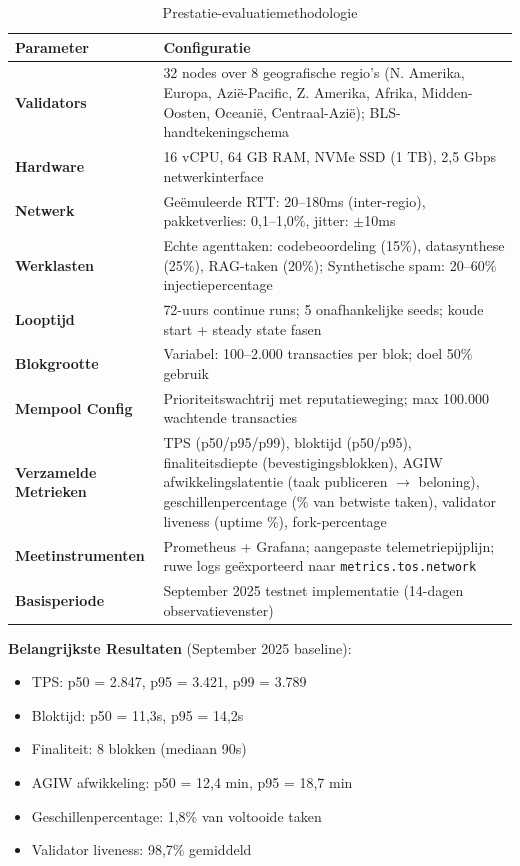 \documentclass[11pt]{article}
\begin{document}
\begin{table}[H]
\centering
\caption{Prestatie-evaluatiemethodologie}
\label{tab:evaluation-methodology}
\begin{tabular}{@{}p{}p{}@{}}
\toprule
\textbf{Parameter} & \textbf{Configuratie} \\ \midrule
\textbf{Validators} & 32 nodes over 8 geografische regio's (N. Amerika, Europa, Azië-Pacific, Z. Amerika, Afrika, Midden-Oosten, Oceanië, Centraal-Azië); BLS-handtekeningschema \\
\textbf{Hardware} & 16 vCPU, 64 GB RAM, NVMe SSD (1 TB), 2,5 Gbps netwerkinterface \\
\textbf{Netwerk} & Geëmuleerde RTT: 20--180ms (inter-regio), pakketverlies: 0,1--1,0\%, jitter: $\pm$10ms \\
\textbf{Werklasten} & Echte agenttaken: codebeoordeling (15\%), datasynthese (25\%), RAG-taken (20\%); Synthetische spam: 20--60\% injectiepercentage \\
\textbf{Looptijd} & 72-uurs continue runs; 5 onafhankelijke seeds; koude start + steady state fasen \\
\textbf{Blokgrootte} & Variabel: 100--2.000 transacties per blok; doel 50\% gebruik \\
\textbf{Mempool Config} & Prioriteitswachtrij met reputatieweging; max 100.000 wachtende transacties \\
\textbf{Verzamelde Metrieken} & TPS (p50/p95/p99), bloktijd (p50/p95), finaliteitsdiepte (bevestigingsblokken), AGIW afwikkelingslatentie (taak publiceren $\rightarrow$ beloning), geschillenpercentage (\% van betwiste taken), validator liveness (uptime \%), fork-percentage \\
\textbf{Meetinstrumenten} & Prometheus + Grafana; aangepaste telemetriepijplijn; ruwe logs geëxporteerd naar \texttt{metrics.tos.network} \\
\textbf{Basisperiode} & September 2025 testnet implementatie (14-dagen observatievenster) \\
\bottomrule
\end{tabular}
\end{table}

\textbf{Belangrijkste Resultaten} (September 2025 baseline):
\begin{itemize}[noitemsep]
  \item TPS: p50 = 2.847, p95 = 3.421, p99 = 3.789
  \item Bloktijd: p50 = 11,3s, p95 = 14,2s
  \item Finaliteit: 8 blokken (mediaan 90s)
  \item AGIW afwikkeling: p50 = 12,4 min, p95 = 18,7 min
  \item Geschillenpercentage: 1,8\% van voltooide taken
  \item Validator liveness: 98,7\% gemiddeld
\end{itemize}
\end{document}
